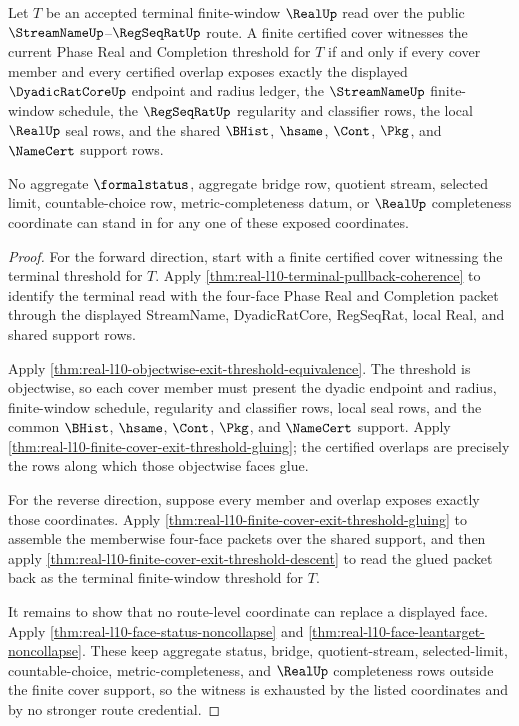 \begin{theorem}
\label{thm:real-l10-terminal-cover-coordinate-exhaustion}
Let $T$ be an accepted terminal finite-window $\RealUp$ read over the public
$\StreamNameUp$--$\RegSeqRatUp$ route. A finite certified cover witnesses the
current Phase Real and Completion threshold for $T$ if and only if every cover
member and every certified overlap exposes exactly the displayed
$\DyadicRatCoreUp$ endpoint and radius ledger, the $\StreamNameUp$
finite-window schedule, the $\RegSeqRatUp$ regularity and classifier rows, the
local $\RealUp$ seal rows, and the shared $\BHist$, $\hsame$, $\Cont$, $\Pkg$,
and $\NameCert$ support rows.

No aggregate $\formalstatus$, aggregate bridge row, quotient stream, selected
limit, countable-choice row, metric-completeness datum, or $\RealUp$
completeness coordinate can stand in for any one of these exposed coordinates.
\end{theorem}
\begin{proof}
For the forward direction, start with a finite certified cover witnessing the
terminal threshold for $T$. Apply
\autoref{thm:real-l10-terminal-pullback-coherence} to identify the terminal
read with the four-face Phase Real and Completion packet through the displayed
StreamName, DyadicRatCore, RegSeqRat, local Real, and shared support rows.

Apply
\autoref{thm:real-l10-objectwise-exit-threshold-equivalence}. The threshold is
objectwise, so each cover member must present the dyadic endpoint and radius,
finite-window schedule, regularity and classifier rows, local seal rows, and
the common $\BHist$, $\hsame$, $\Cont$, $\Pkg$, and $\NameCert$ support. Apply
\autoref{thm:real-l10-finite-cover-exit-threshold-gluing}; the certified
overlaps are precisely the rows along which those objectwise faces glue.

For the reverse direction, suppose every member and overlap exposes exactly
those coordinates. Apply
\autoref{thm:real-l10-finite-cover-exit-threshold-gluing} to assemble the
memberwise four-face packets over the shared support, and then apply
\autoref{thm:real-l10-finite-cover-exit-threshold-descent} to read the glued
packet back as the terminal finite-window threshold for $T$.

It remains to show that no route-level coordinate can replace a displayed
face. Apply \autoref{thm:real-l10-face-status-noncollapse} and
\autoref{thm:real-l10-face-leantarget-noncollapse}. These keep aggregate
status, bridge, quotient-stream, selected-limit, countable-choice,
metric-completeness, and $\RealUp$ completeness rows outside the finite cover
support, so the witness is exhausted by the listed coordinates and by no
stronger route credential.
\end{proof}

